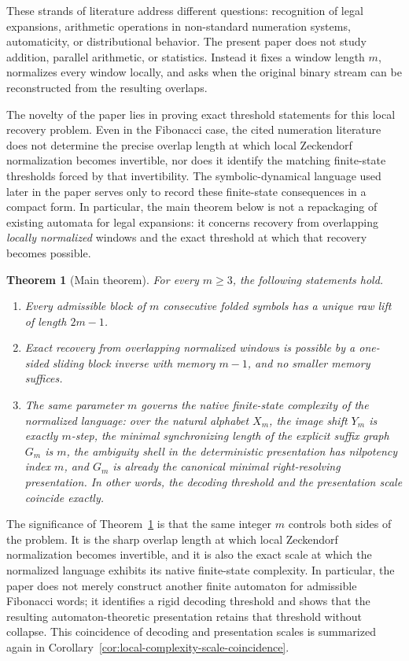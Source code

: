\documentclass[11pt,letterpaper]{article}
\numberwithin{equation}{section}
\theoremstyle{plain}
\newtheorem{theorem}{Theorem}[section]
\theoremstyle{definition}
\theoremstyle{remark}
\begin{document}
These strands of literature address different questions: recognition of legal
expansions, arithmetic operations in non-standard numeration systems,
automaticity, or distributional behavior.  The present paper does not study
addition, parallel arithmetic, or statistics.  Instead it fixes a window length
$m$, normalizes every window locally, and asks when the original binary stream
can be reconstructed from the resulting overlaps.

The novelty of the paper lies in proving exact threshold statements for this
local recovery problem.  Even in the Fibonacci case, the cited numeration
literature does not determine the precise overlap length at which local
Zeckendorf normalization becomes invertible, nor does it identify the matching
finite-state thresholds forced by that invertibility.  The symbolic-dynamical
language used later in the paper serves only to record these finite-state
consequences in a compact form.  In particular, the main theorem below is not a
repackaging of existing automata for legal expansions: it concerns recovery
from overlapping \emph{locally normalized} windows and the exact threshold at
which that recovery becomes possible.

\begin{theorem}[Main theorem]
\label{thm:intro-main}
For every $m\ge 3$, the following statements hold.
\begin{enumerate}[label=\textup{(\roman*)}]
\item Every admissible block of $m$ consecutive folded symbols has a unique raw
lift of length $2m-1$.
\item Exact recovery from overlapping normalized windows is possible by a
one-sided sliding block inverse with memory $m-1$, and no smaller memory
suffices.
\item The same parameter $m$ governs the native finite-state complexity of the
normalized language: over the natural alphabet $X_m$, the image shift $Y_m$ is
exactly $m$-step, the minimal synchronizing length of the explicit suffix graph
$G_m$ is $m$, the ambiguity shell in the deterministic presentation has
nilpotency index $m$, and $G_m$ is already the canonical minimal
right-resolving presentation.  In other words, the decoding threshold and the
presentation scale coincide exactly.
\end{enumerate}
\end{theorem}

The significance of Theorem~\ref{thm:intro-main} is that the same integer $m$
controls both sides of the problem.  It is the sharp overlap length at which
local Zeckendorf normalization becomes invertible, and it is also the exact
scale at which the normalized language exhibits its native finite-state
complexity.  In particular, the paper does not merely construct another finite
automaton for admissible Fibonacci words; it identifies a rigid decoding
threshold and shows that the resulting automaton-theoretic presentation retains
that threshold without collapse.  This coincidence of decoding and presentation
scales is summarized again in
Corollary~\ref{cor:local-complexity-scale-coincidence}.
\end{document}
